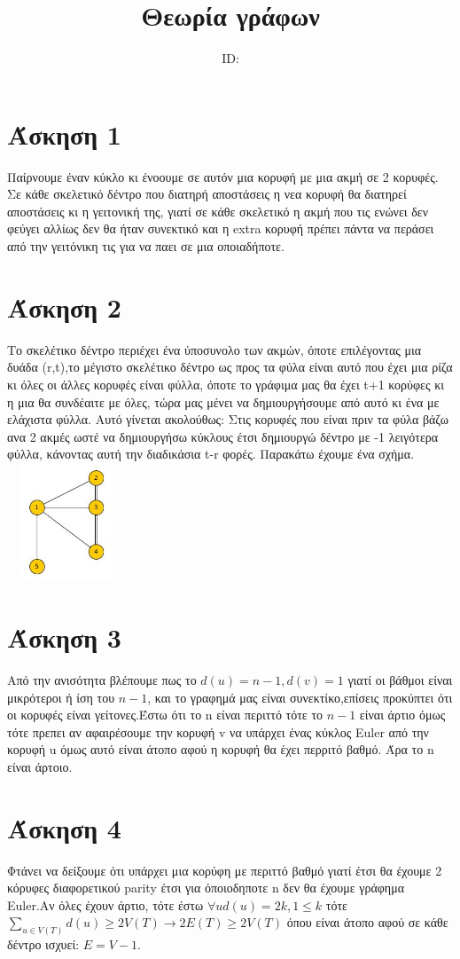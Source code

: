\documentclass{article}
\title{Θεωρία γράφων \\ \exerciseset}
\author{\studentname \qquad  ID: \suid}
\begin{document}
\maketitle
\section*{Άσκηση 1}
Παίρνουμε έναν κύκλο κι ένοουμε σε αυτόν μια κορυφή με μια ακμή σε 2 κορυφές. Σε κάθε σκελετικό δέντρο που διατηρή αποστάσεις η νεα κορυφή θα διατηρεί αποστάσεις κι η γειτονική της, γιατί σε κάθε σκελετικό η ακμή που τις ενώνει δεν φεύγει αλλίως δεν θα ήταν συνεκτικό και η extra κορυφή πρέπει πάντα να περάσει από την γειτόνικη τις για να παει σε μια οποιαδήποτε.
\section*{Άσκηση 2}
Το σκελέτικο δέντρο περιέχει ένα ύποσυνολο των ακμών, όποτε επιλέγοντας μια δυάδα (r,t),το μέγιστο σκελέτικο δέντρο ως προς τα φύλα είναι αυτό που έχει μια ρίζα κι όλες οι άλλες κορυφές είναι φύλλα, όποτε το γράφιμα μας θα έχει t+1 κορύφες κι η μια θα συνδέαιτε με όλες, τώρα μας μένει να δημιουργήσουμε από αυτό κι ένα με ελάχιστα φύλλα. Αυτό γίνεται ακολούθως: Στις κορυφές που είναι πριν τα φύλα βάζω ανα 2 ακμές ωστέ να δημιουργήσω κύκλους έτσι δημιουργώ δέντρο με -1 λειγότερα φύλλα, κάνοντας αυτή την διαδικάσια t-r φορές.
Παρακάτω έχουμε ένα σχήμα. \includegraphics[height=100pt,width=100pt]{ex2} 
 \section*{Άσκηση 3}
Από την ανισότητα βλέπουμε πως το $d(u)=n-1,d(v)=1$ γιατί οι βάθμοι είναι μικρότεροι ή ίση του $n-1$, και το γραφημά μας είναι συνεκτίκο,επίσεις προκύπτει ότι οι κορυφές είναι γείτονες.Έστω ότι το n είναι περιττό τότε το $n-1$ είναι άρτιο όμως τότε πρεπει αν αφαιρέσουμε την κορυφή v να υπάρχει ένας κύκλος Euler από την κορυφή u όμως αυτό είναι άτοπο αφού η κορυφή θα έχει περριτό βαθμό. Άρα το n είναι άρτοιο.
\section*{Άσκηση 4}
Φτάνει να δείξουμε ότι υπάρχει μια κορύφη με περιττό βαθμό γιατί έτσι θα έχουμε 2 κόρυφες διαφορετικού parity έτσι για όποιοδηποτε n δεν θα έχουμε γράφημα Euler.Αν όλες έχουν άρτιο, τότε έστω $\forall u d(u)=2k,1\le k$ τότε $\sum_{u \in V(T)}d(u) \ge 2V(T) \rightarrow 2E(T)\ge 2V(T)$ όπου είναι άτοπο αφού σε κάθε δέντρο ισχυεί: $E=V-1$.
\end{document}
